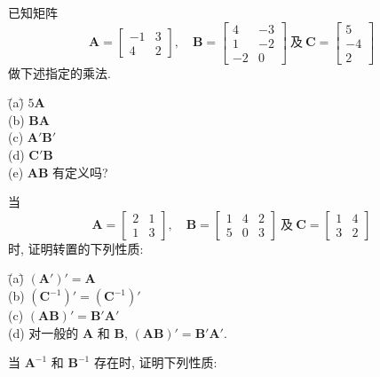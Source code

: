 \medskip
{}\quad 已知矩阵
\[
\mathbf{A}=\begin{bmatrix}-1&3\\4&2\end{bmatrix},\quad
\mathbf{B}=\begin{bmatrix}4&-3\\1&-2\\-2&0\end{bmatrix}\ \text{及}\
\mathbf{C}=\begin{bmatrix}5\\-4\\2\end{bmatrix}
\]
做下述指定的乘法.
\begin{tabbing}
\hspace*{2em}\=(a)\quad \= $5\mathbf{A}$\\[2pt]
\>(b)\> $\mathbf{B}\mathbf{A}$\\[2pt]
\>(c)\> $\mathbf{A}'\mathbf{B}'$\\[2pt]
\>(d)\> $\mathbf{C}'\mathbf{B}$\\[2pt]
\>(e)\> $\mathbf{A}\mathbf{B}$ 有定义吗?
\end{tabbing}

\medskip
\noindent 2.3\quad 当
\[
\mathbf{A}=\begin{bmatrix}2&1\\1&3\end{bmatrix},\quad
\mathbf{B}=\begin{bmatrix}1&4&2\\5&0&3\end{bmatrix}\ \text{及}\
\mathbf{C}=\begin{bmatrix}1&4\\3&2\end{bmatrix}
\]
时, 证明转置的下列性质:
\begin{tabbing}
\hspace*{2em}\=(a)\quad \= $(\mathbf{A}')'=\mathbf{A}$\\[2pt]
\>(b)\> $(\mathbf{C}^{-1})'=(\mathbf{C}^{-1})'$\\[2pt]
\>(c)\> $(\mathbf{A}\mathbf{B})'=\mathbf{B}'\mathbf{A}'$\\[2pt]
\>(d)\> 对一般的 $\mathbf{A}$ 和 $\mathbf{B}$, $(\mathbf{A}\mathbf{B})'=\mathbf{B}'\mathbf{A}'$.
\end{tabbing}

\medskip
\noindent 2.4\quad 当 $\mathbf{A}^{-1}$ 和 $\mathbf{B}^{-1}$ 存在时, 证明下列性质:
